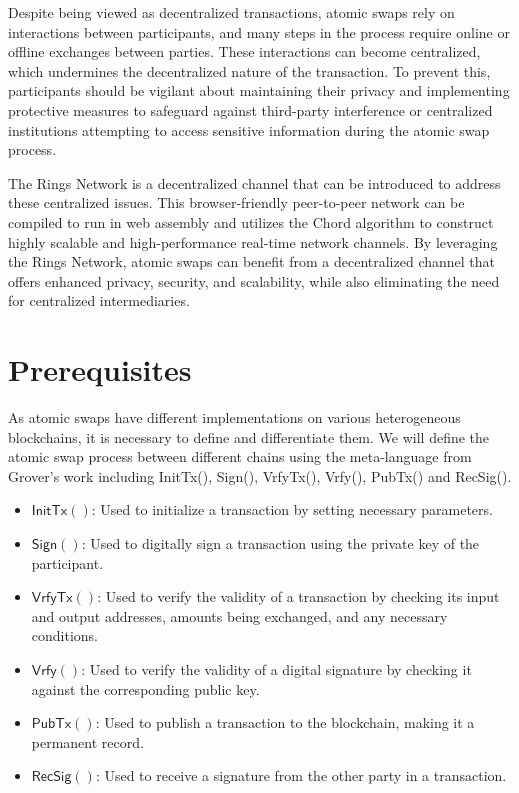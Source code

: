 \documentclass[twocolumn]{article}
\newcommand{\Sign}{\textsf{Sign}}
\newcommand{\Verify}{\textsf{Vrfy}}
\newcommand{\InitTx}{\textsf{InitTx}}
\newcommand{\VrfyTx}{\textsf{VrfyTx}}
\newcommand{\PubTx}{\textsf{PubTx}}
\newcommand{\RecSig}{\textsf{RecSig}}
\begin{document}
Despite being viewed as decentralized transactions, atomic swaps rely on interactions between participants, and many steps in the process require online or offline exchanges between parties. These interactions can become centralized, which undermines the decentralized nature of the transaction. To prevent this, participants should be vigilant about maintaining their privacy and implementing protective measures to safeguard against third-party interference or centralized institutions attempting to access sensitive information during the atomic swap process.

The Rings Network is a decentralized channel that can be introduced to address these centralized issues. This browser-friendly peer-to-peer network can be compiled to run in web assembly and utilizes the Chord algorithm to construct highly scalable and high-performance real-time network channels. By leveraging the Rings Network, atomic swaps can benefit from a decentralized channel that offers enhanced privacy, security, and scalability, while also eliminating the need for centralized intermediaries.


\section{Prerequisites}
As atomic swaps have different implementations on various heterogeneous blockchains, it is necessary to define and differentiate them. We will define the atomic swap process between different chains using the meta-language from Grover's work \cite{grover2018bitcoin} including InitTx(), Sign(), VrfyTx(), Vrfy(), PubTx() and RecSig().

\begin{itemize}[itemsep=2pt,topsep=0pt,parsep=0pt]
  \item $\InitTx()$: Used to initialize a transaction by setting necessary parameters.

  \item $\Sign()$: Used to digitally sign a transaction using the private key of the participant.

  \item $\VrfyTx()$: Used to verify the validity of a transaction by checking its input and output addresses, amounts being exchanged, and any necessary conditions.

  \item $\Verify()$: Used to verify the validity of a digital signature by checking it against the corresponding public key.

  \item $\PubTx()$: Used to publish a transaction to the blockchain, making it a permanent record.

  \item $\RecSig()$: Used to receive a signature from the other party in a transaction.
\end{itemize}
\end{document}

